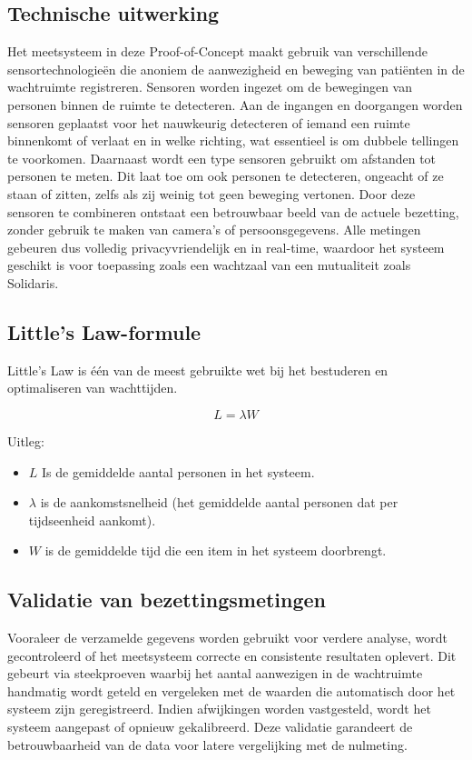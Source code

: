 \subsection{Technische uitwerking}
Het meetsysteem in deze Proof-of-Concept maakt gebruik van verschillende sensortechnologieën die anoniem de aanwezigheid en beweging van patiënten in de wachtruimte registreren. Sensoren worden ingezet om de bewegingen van personen binnen de ruimte te detecteren. Aan de ingangen en doorgangen worden sensoren geplaatst voor het nauwkeurig detecteren of iemand een ruimte binnenkomt of verlaat en in welke richting, wat essentieel is om dubbele tellingen te voorkomen. Daarnaast wordt een type sensoren gebruikt om afstanden tot personen te meten. Dit laat toe om ook personen te detecteren, ongeacht of ze staan of zitten, zelfs als zij weinig tot geen beweging vertonen. Door deze sensoren te combineren ontstaat een betrouwbaar beeld van de actuele bezetting, zonder gebruik te maken van camera’s of persoonsgegevens. Alle metingen gebeuren dus volledig privacyvriendelijk en in real-time, waardoor het systeem geschikt is voor toepassing zoals een wachtzaal van een mutualiteit zoals Solidaris.

\subsection{Little's Law-formule}
Little's Law is één van de meest gebruikte wet bij het bestuderen en optimaliseren van wachttijden.

\[
L = \lambda W
\]

Uitleg:
\begin{itemize}
    \item \( L \) Is de gemiddelde aantal personen in het systeem.
    \item \( \lambda \) is de aankomstsnelheid (het gemiddelde aantal personen dat per tijdseenheid aankomt).
    \item \( W \) is de gemiddelde tijd die een item in het systeem doorbrengt.
\end{itemize}

\subsection{Validatie van bezettingsmetingen}
Vooraleer de verzamelde gegevens worden gebruikt voor verdere analyse, wordt gecontroleerd of het meetsysteem correcte en consistente resultaten oplevert. Dit gebeurt via steekproeven waarbij het aantal aanwezigen in de wachtruimte handmatig wordt geteld en vergeleken met de waarden die automatisch door het systeem zijn geregistreerd. Indien afwijkingen worden vastgesteld, wordt het systeem aangepast of opnieuw gekalibreerd. Deze validatie garandeert de betrouwbaarheid van de data voor latere vergelijking met de nulmeting.

